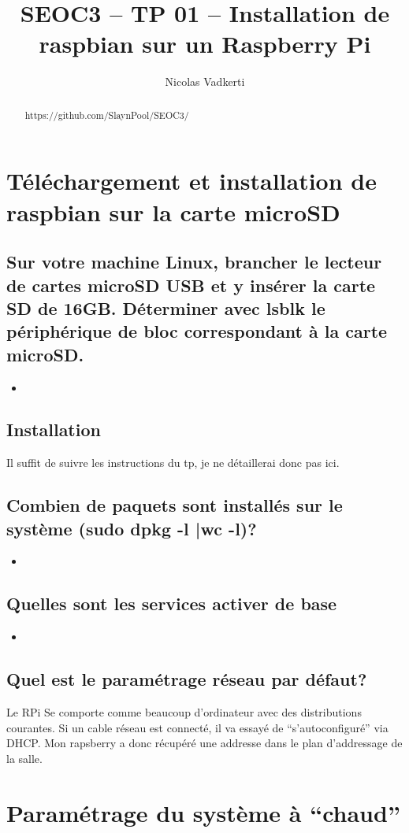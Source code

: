 \documentclass[a4paper,10pt]{article}
\title{SEOC3 – TP 01 – Installation de raspbian sur un Raspberry Pi}
\author{Nicolas Vadkerti}
\newcommand{\insertcode}[2]{\begin{itemize}\item[]\end{itemize}}
\begin{document}
\maketitle
\begin{abstract}
 https://github.com/SlaynPool/SEOC3/
\end{abstract}



\section{Téléchargement et installation de raspbian sur la carte microSD}
\subsection{Sur votre machine Linux, brancher le lecteur de cartes microSD USB et y insérer la carte SD de 16GB. Déterminer avec lsblk le périphérique de bloc correspondant à la carte microSD.}


\insertcode{commande/1.txt}{LSBLK output}

\subsection{Installation}
Il suffit de suivre les instructions du tp, je ne détaillerai donc pas ici.

\subsection{Combien de paquets sont installés sur le système (sudo dpkg -l |wc -l)?}
\insertcode{commande/2.txt}{dpkg output}
\newpage
\subsection{Quelles sont les services activer de base}
\insertcode{commande/3.txt}{Service activé de base}
\subsection{Quel est le paramétrage réseau par défaut?}
Le RPi Se comporte comme beaucoup d'ordinateur avec des distributions courantes. Si un cable réseau est connecté, il va essayé de ``s'autoconfiguré''  via DHCP. Mon rapsberry a donc récupéré une addresse dans le plan d'addressage de la salle.





\section{Paramétrage du système à ``chaud''}
\end{document}

